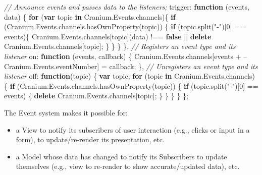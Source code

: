 \documentclass[9pt]{book}
\newenvironment{Shaded}{}{}
\newcommand{\KeywordTok}[1]{\textcolor[rgb]{0.00,0.44,0.13}{\textbf{{#1}}}}
\newcommand{\DataTypeTok}[1]{\textcolor[rgb]{0.56,0.13,0.00}{{#1}}}
\newcommand{\DecValTok}[1]{\textcolor[rgb]{0.25,0.63,0.44}{{#1}}}
\newcommand{\StringTok}[1]{\textcolor[rgb]{0.25,0.44,0.63}{{#1}}}
\newcommand{\CommentTok}[1]{\textcolor[rgb]{0.38,0.63,0.69}{\textit{{#1}}}}
\newcommand{\OtherTok}[1]{\textcolor[rgb]{0.00,0.44,0.13}{{#1}}}
\newcommand{\FunctionTok}[1]{\textcolor[rgb]{0.02,0.16,0.49}{{#1}}}
\newcommand{\NormalTok}[1]{{#1}}
\begin{document}
\begin{Shaded}
\begin{Highlighting}[]
  \CommentTok{// Announce events and passes data to the listeners;}
  \DataTypeTok{trigger}\NormalTok{: }\KeywordTok{function} \NormalTok{(events, data) \{}
    \KeywordTok{for} \NormalTok{(}\KeywordTok{var} \NormalTok{topic }\KeywordTok{in} \OtherTok{Cranium}\NormalTok{.}\OtherTok{Events}\NormalTok{.}\FunctionTok{channels}\NormalTok{)\{}
      \KeywordTok{if} \NormalTok{(}\OtherTok{Cranium}\NormalTok{.}\OtherTok{Events}\NormalTok{.}\OtherTok{channels}\NormalTok{.}\FunctionTok{hasOwnProperty}\NormalTok{(topic)) \{}
        \KeywordTok{if} \NormalTok{(}\OtherTok{topic}\NormalTok{.}\FunctionTok{split}\NormalTok{(}\StringTok{"-"}\NormalTok{)[}\DecValTok{0}\NormalTok{] == events)\{}
          \OtherTok{Cranium}\NormalTok{.}\OtherTok{Events}\NormalTok{.}\FunctionTok{channels}\NormalTok{[topic](data) !== }\KeywordTok{false} \NormalTok{|| }\KeywordTok{delete} \OtherTok{Cranium}\NormalTok{.}\OtherTok{Events}\NormalTok{.}\FunctionTok{channels}\NormalTok{[topic];}
        \NormalTok{\}}
      \NormalTok{\}}
    \NormalTok{\}}
  \NormalTok{\},}
  \CommentTok{// Registers an event type and its listener}
  \DataTypeTok{on}\NormalTok{: }\KeywordTok{function} \NormalTok{(events, callback) \{}
    \OtherTok{Cranium}\NormalTok{.}\OtherTok{Events}\NormalTok{.}\FunctionTok{channels}\NormalTok{[events + --}\OtherTok{Cranium}\NormalTok{.}\OtherTok{Events}\NormalTok{.}\FunctionTok{eventNumber}\NormalTok{] = callback;}
  \NormalTok{\},}
  \CommentTok{// Unregisters an event type and its listener}
  \DataTypeTok{off}\NormalTok{: }\KeywordTok{function}\NormalTok{(topic) \{}
    \KeywordTok{var} \NormalTok{topic;}
    \KeywordTok{for} \NormalTok{(topic }\KeywordTok{in} \OtherTok{Cranium}\NormalTok{.}\OtherTok{Events}\NormalTok{.}\FunctionTok{channels}\NormalTok{) \{}
      \KeywordTok{if} \NormalTok{(}\OtherTok{Cranium}\NormalTok{.}\OtherTok{Events}\NormalTok{.}\OtherTok{channels}\NormalTok{.}\FunctionTok{hasOwnProperty}\NormalTok{(topic)) \{}
        \KeywordTok{if} \NormalTok{(}\OtherTok{topic}\NormalTok{.}\FunctionTok{split}\NormalTok{(}\StringTok{"-"}\NormalTok{)[}\DecValTok{0}\NormalTok{] == events) \{}
          \KeywordTok{delete} \OtherTok{Cranium}\NormalTok{.}\OtherTok{Events}\NormalTok{.}\FunctionTok{channels}\NormalTok{[topic];}
        \NormalTok{\}}
      \NormalTok{\}}
    \NormalTok{\}}
  \NormalTok{\}}
\NormalTok{\};}
\end{Highlighting}
\end{Shaded}

The Event system makes it possible for:

\begin{itemize}
\itemsep1pt\parskip0pt
\item
  a View to notify its subscribers of user interaction (e.g., clicks or
  input in a form), to update/re-render its presentation, etc.
\item
  a Model whose data has changed to notify its Subscribers to update
  themselves (e.g., view to re-render to show accurate/updated data),
  etc.
\end{itemize}
\end{document}
